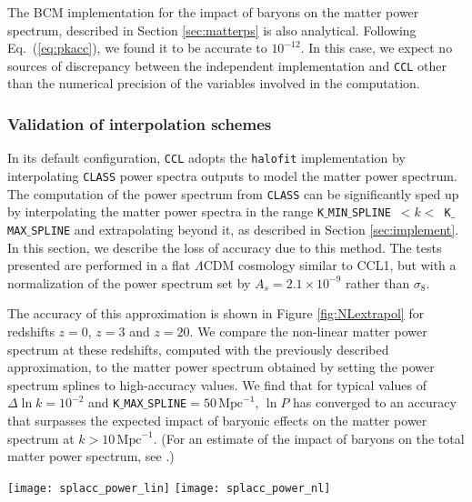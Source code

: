 \documentclass[\docopts]{\docclass}
\newcommand{\ccl}{{\tt CCL}\xspace}
\newcommand{\halofit}{{\tt halofit}\xspace}
\newcommand{\class}{{\tt CLASS}\xspace}
\begin{document}
The BCM implementation for the impact of baryons on the matter power spectrum, described in Section \ref{sec:matterps} is also analytical. Following Eq.~(\ref{eq:pkacc}), we found it to be accurate to $10^{-12}$. In this case, we expect no sources of discrepancy between the independent implementation and \ccl other than the numerical precision of the variables involved in the computation.

\subsubsection{Validation of interpolation schemes}
\label{ss:classval}

In its default configuration, \ccl adopts the \halofit \citep{CLASS_halofit} implementation by interpolating \class power spectra outputs to model the matter power spectrum. The computation of the power spectrum from \class can be significantly sped up by interpolating the matter power spectra in the range {\tt K$\_$MIN$\_$SPLINE}~$<k<$~{\tt K$\_$MAX$\_$SPLINE} and extrapolating beyond it, as described in Section \ref{sec:implement}. In this section, we describe the loss of accuracy due to this method. The tests presented are performed in a flat $\Lambda$CDM cosmology similar to CCL1, but with a normalization of the power spectrum set by $A_s=2.1\times10^{-9}$ rather than $\sigma_8$.

The accuracy of this approximation is shown in Figure \ref{fig:NLextrapol} for redshifts $z=0$, $z=3$ and $z=20$. We compare the non-linear matter power spectrum at these redshifts, computed with the previously described approximation, to the matter power spectrum obtained by setting the power spectrum splines to high-accuracy values. We find that for typical values of $\Delta \ln k=10^{-2}$ and {\tt K$\_$MAX$\_$SPLINE}$=50\,\text{Mpc}^{-1}$, $\ln P$ has converged to an accuracy that surpasses the expected impact of baryonic effects on the matter power spectrum at $k>10\,\text{Mpc}^{-1}$. (For an estimate of the impact of baryons on the total matter power spectrum, see \citealt{Schneider15}.) 

\begin{figure*}
\centering
  \texttt{[image: splacc\_power\_lin]}
  \texttt{[image: splacc\_power\_nl]}
\caption{The relative error compared to power spectra produced with high values of the power spectrum splines, $P_{fid}$, produced by splining the matter power spectrum up to {\tt K$\_$MAX$\_$SPLINE}$=50\,\text{Mpc}^{-1}$ and extrapolating beyond this value with a second order Taylor expansion the natural logarithm of the matter power spectrum. The left panel shows the relative errors for the linear matter power spectrum at $z=0$, $z=3$ and $z=20$. The right panel shows the results for the non-linear matter power spectrum at the same redshifts. While the relative error increases substantially at high $k$, we note that it is still well below the uncertainty from baryonic physics at these scales, which is $\sim 10\%$ at $k=1\,\text{Mpc}^{-1}$ \citep{Schneider15}.}
\label{fig:NLextrapol}
\end{figure*}
\end{document}
